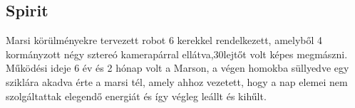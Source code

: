 \renewcommand{\xname}{Spirit}
\renewcommand{\x}{1.6}
\renewcommand{\y}{2.3}
\renewcommand{\z}{1.5}
\renewcommand{\weight}{35 (felszereléssel 180)}
\renewcommand{\img}{MobilisRobotok/Spirit/spirit.jpg}
\renewcommand{\sources}{Forrás:
https://en.wikipedia.org/wiki/Mars_Exploration_Rover}
\renewcommand{\captionn}{Spirit nevű Mars járó robot.}
\renewcommand{\watherProf}{Igen -3m ig.}
\renewcommand{\sebesseg}{0.05(avg 0.01)}
\renewcommand{\AcAndGy}{Igen}
\renewcommand{\GPS}{Igen}
\subsection*{Spirit}
 Marsi körülményekre tervezett robot 6 kerekkel rendelkezett, amelyből 4 kormányzott
 négy sztereó kamerapárral ellátva,30\degree lejtőt volt képes megmászni. 
Működési ideje 6 év és 2 hónap volt a Marson, a végen homokba süllyedve egy sziklára akadva
érte a marsi tél, amely ahhoz vezetett, hogy a nap elemei nem szolgáltattak elegendő
energiát és így végleg leállt és kihűlt.

\renewcommand{\aspectratioPic}{0.5}




